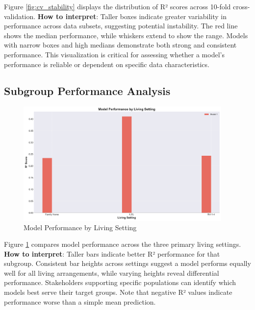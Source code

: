 Figure \ref{fig:cv_stability} displays the distribution of R² scores across 10-fold cross-validation. \textbf{How to interpret}: Taller boxes indicate greater variability in performance across data subsets, suggesting potential instability. The red line shows the median performance, while whiskers extend to show the range. Models with narrow boxes and high medians demonstrate both strong and consistent performance. This visualization is critical for assessing whether a model's performance is reliable or dependent on specific data characteristics.

\subsection{Subgroup Performance Analysis}

\begin{figure}[h!]
\centering
\includegraphics[width=0.95\textwidth]{figures/plot_h_living_setting.png}
\caption{Model Performance by Living Setting}
\label{fig:living_setting_performance}
\end{figure}

Figure \ref{fig:living_setting_performance} compares model performance across the three primary living settings. \textbf{How to interpret}: Taller bars indicate better R² performance for that subgroup. Consistent bar heights across settings suggest a model performs equally well for all living arrangements, while varying heights reveal differential performance. Stakeholders supporting specific populations can identify which models best serve their target groups. Note that negative R² values indicate performance worse than a simple mean prediction.

